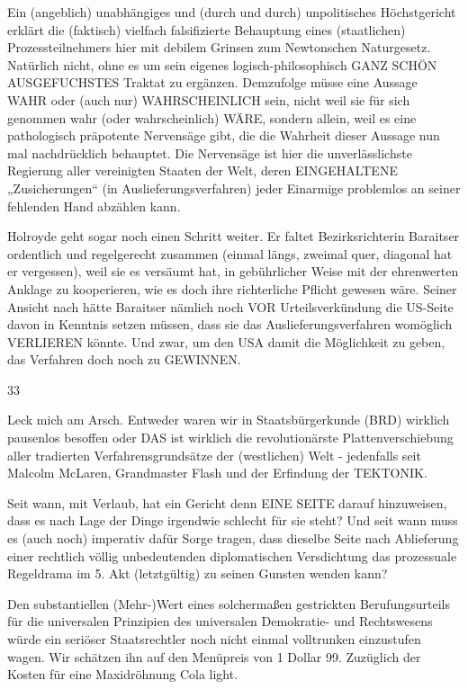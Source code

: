 \begin{multicols}{2}
Ein (angeblich) unabhängiges und (durch und durch)
unpolitisches Höchstgericht erklärt die (faktisch) vielfach falsifizierte Behauptung eines (staatlichen) Prozessteilnehmers hier mit debilem Grinsen zum Newtonschen Naturgesetz. Natürlich nicht, ohne es um sein
eigenes logisch-philosophisch GANZ SCHÖN AUSGEFUCHSTES Traktat zu ergänzen. Demzufolge müsse
eine Aussage WAHR oder (auch nur) WAHRSCHEINLICH sein, nicht weil sie für sich genommen wahr (oder
wahrscheinlich) WÄRE, sondern allein, weil es eine pathologisch präpotente Nervensäge gibt, die die Wahrheit
dieser Aussage nun mal nachdrücklich behauptet. Die
Nervensäge ist hier die unverlässlichste Regierung aller vereinigten Staaten der Welt, deren EINGEHALTENE
„Zusicherungen“ (in Auslieferungsverfahren) jeder Einarmige problemlos an seiner fehlenden Hand abzählen
kann.

Holroyde geht sogar noch einen Schritt weiter. Er faltet
Bezirksrichterin Baraitser ordentlich und regelgerecht
zusammen (einmal längs, zweimal quer, diagonal hat er
vergessen), weil sie es versäumt hat, in gebührlicher Weise mit der ehrenwerten Anklage zu kooperieren, wie es
doch ihre richterliche Pflicht gewesen wäre. Seiner Ansicht nach hätte Baraitser nämlich noch VOR Urteilsverkündung die US-Seite davon in Kenntnis setzen müssen,
dass sie das Auslieferungsverfahren womöglich VERLIEREN könnte. Und zwar, um den USA damit die Möglichkeit zu geben, das Verfahren doch noch zu GEWINNEN.

33

Leck mich am Arsch. Entweder waren wir in Staatsbürgerkunde (BRD) wirklich pausenlos besoffen oder DAS
ist wirklich die revolutionärste Plattenverschiebung aller
tradierten Verfahrensgrundsätze der (westlichen) Welt
- jedenfalls seit Malcolm McLaren, Grandmaster Flash
und der Erfindung der TEKTONIK.

Seit wann, mit Verlaub, hat ein Gericht denn EINE SEITE
darauf hinzuweisen, dass es nach Lage der Dinge irgendwie schlecht für sie steht? Und seit wann muss es (auch
noch) imperativ dafür Sorge tragen, dass dieselbe Seite
nach Ablieferung einer rechtlich völlig unbedeutenden
diplomatischen Versdichtung das prozessuale Regeldrama im 5. Akt (letztgültig) zu seinen Gunsten wenden
kann?

Den substantiellen (Mehr-)Wert eines solchermaßen gestrickten Berufungsurteils für die universalen Prinzipien
des universalen Demokratie- und Rechtswesens würde
ein seriöser Staatsrechtler noch nicht einmal volltrunken einzustufen wagen. Wir schätzen ihn auf den Menüpreis von 1 Dollar 99. Zuzüglich der Kosten für eine
Maxidröhnung Cola light.


\end{multicols}
